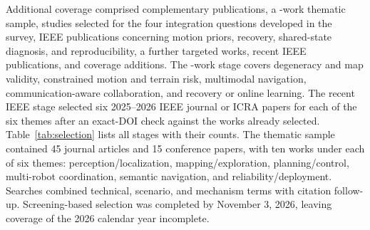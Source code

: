 \documentclass[journal]{IEEEtran}
\begin{document}
Additional coverage comprised \SupplementCount{} complementary publications, a \ExpansionCount{}-work thematic sample, \FollowupCount{} studies selected for the four integration questions developed in the survey, \IEEECount{} IEEE publications concerning motion priors, recovery, shared-state diagnosis, and reproducibility, a further \SurveyExpansionCount{} targeted works, \IEEERefreshCount{} recent IEEE publications, and \CoverageCount{} coverage additions. The \SurveyExpansionCount{}-work stage covers degeneracy and map validity, constrained motion and terrain risk, multimodal navigation, communication-aware collaboration, and recovery or online learning. The recent IEEE stage selected six 2025--2026 IEEE journal or ICRA papers for each of the six themes after an exact-DOI check against the works already selected. Table~\ref{tab:selection} lists all stages with their counts. The thematic sample contained 45 journal articles and 15 conference papers, with ten works under each of six themes: perception/localization, mapping/exploration, planning/control, multi-robot coordination, semantic navigation, and reliability/deployment. Searches combined technical, scenario, and mechanism terms with citation follow-up. Screening-based selection was completed by November 3, 2026, leaving coverage of the 2026 calendar year incomplete.
\end{document}
